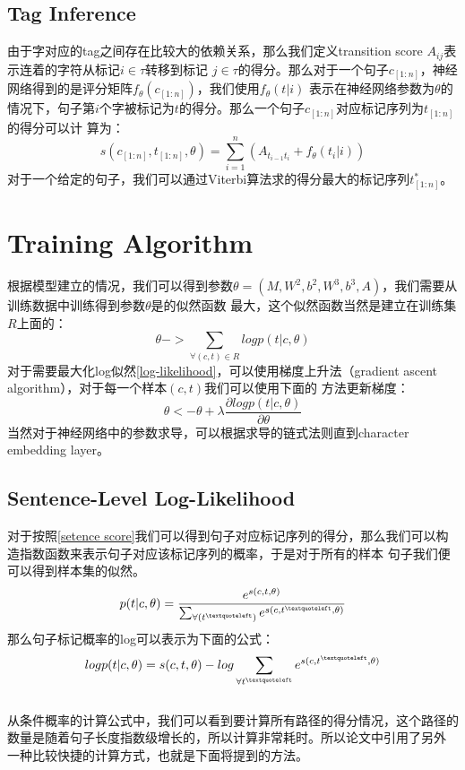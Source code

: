 \documentclass[UTF8]{ctexart}
\begin{document}
\subsection{Tag Inference}
由于字对应的tag之间存在比较大的依赖关系，那么我们定义transition score $A_{ij}$表示连着的字符从标记$i \in \tau$转移到标记
$j \in \tau$的得分。那么对于一个句子$c_{[1:n]}$，神经网络得到的是评分矩阵$f_{\theta}(c_{[1:n]})$，我们使用$f_{\theta}(t|i)$
表示在神经网络参数为$\theta$的情况下，句子第$i$个字被标记为$t$的得分。那么一个句子$c_{[1:n]}$对应标记序列为$t_{[1:n]}$的得分可以计
算为：
\begin{equation}
s(c_{[1:n]}, t_{[1:n]}, \theta) = \sum_{i=1}^n(A_{t_{i-1}t_i} + f_{\theta}(t_i|i))
\label{setence score}
\end{equation}
对于一个给定的句子，我们可以通过Viterbi算法求的得分最大的标记序列$t_{[1:n]}^*$。


\section{Training Algorithm}
根据模型建立的情况，我们可以得到参数$\theta = (M, W^2, b^2, W^3, b^3, A)$，我们需要从训练数据中训练得到参数$\theta$是的似然函数
最大，这个似然函数当然是建立在训练集$R$上面的：
\begin{equation}
\theta -> \sum_{\forall (c,t) \in R} logp(t|c, \theta)
\label{log-likelihood}
\end{equation}
对于需要最大化log似然\ref{log-likelihood}，可以使用梯度上升法（gradient ascent algorithm），对于每一个样本$(c,t)$我们可以使用下面的
方法更新梯度：
\begin{equation}
\theta <- \theta + \lambda \frac{\partial logp(t|c,\theta)}{\partial \theta}
\label{gradient ascent update}
\end{equation}
当然对于神经网络中的参数求导，可以根据求导的链式法则直到character embedding layer。

\subsection{Sentence-Level Log-Likelihood}
对于按照\ref{setence score}我们可以得到句子对应标记序列的得分，那么我们可以构造指数函数来表示句子对应该标记序列的概率，于是对于所有的样本
句子我们便可以得到样本集的似然。
\begin{equation}
p(t|c, \theta) = \frac{e^{s(c, t, \theta)}}{\sum_{\forall (t^{\textquoteleft})}e^{s(c, t^{\textquoteleft}, \theta)}}
\label{setence probability}
\end{equation}
那么句子标记概率的log可以表示为下面的公式：
\begin{equation}
logp(t|c, \theta) = s(c, t, \theta) - log \sum_{\forall t^{\textquoteleft}} e^{s(c, t^{\textquoteleft}, \theta)}
\end{equation}
\\
从条件概率的计算公式中，我们可以看到要计算所有路径的得分情况，这个路径的数量是随着句子长度指数级增长的，所以计算非常耗时。所以论文中引用了另外
一种比较快捷的计算方式，也就是下面将提到的方法。
\end{document}
